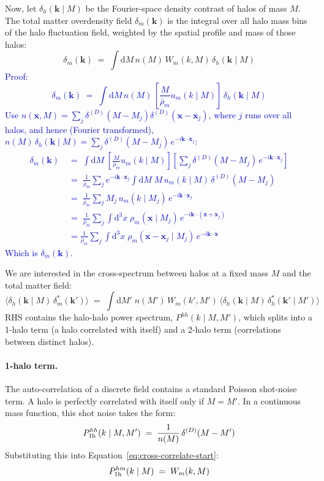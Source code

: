 \documentclass{article}
\newcommand{\dd}{\mathrm{d}}
\newcommand{\bx}{\mathbf{x}}
\newcommand{\bk}{\mathbf{k}}
\begin{document}
Now, let $\delta_h(\bk \mid M)$ be the Fourier-space density contrast of halos of mass $M$. The total matter overdensity field $\delta_m(\bk)$ is the integral over all halo mass bins of the halo fluctuation field, weighted by the spatial profile and mass of those halos:
\begin{equation}
    \delta_m(\bk) \;=\; \int \dd M \, n(M) \, W_m(k,M) \, \delta_h(\bk \mid M)
    \label{eq:stack}
\end{equation}
\textcolor{blue}{
Proof:
\[
    \delta_m(\bk) \;=\; \int \dd M \, n(M) \, \left[ \frac{M}{\bar\rho_m} u_m(k \mid M) \right] \, \delta_h(\bk \mid M)
\]
Use $n(\bx, M) = \sum_j \delta^{(D)}(M - M_j)\delta^{(D)}(\bx - \bx_j)$, where $j$ runs over all halos, and hence (Fourier transformed), $n(M) \, \delta_h(\bk \mid M) = \sum_{j} \delta^{(D)}(M - M_j) \, e^{-i \bk \cdot \bx_j}$:
\begin{align*}
    \delta_m(\bk) \; &=\; \int \dd M \; \left[ \frac{M}{\bar\rho_m} u_m(k \mid M) \right] \left[ \sum_{j} \delta^{(D)}(M - M_j) \, e^{-i \bk \cdot \bx_j} \right] \\
    &=\; \frac{1}{\bar\rho_m} \sum_{j} e^{-i \bk \cdot \bx_j} \int \dd M \; M \, u_m(k \mid M) \, \delta^{(D)}(M - M_j) \\
    &=\; \frac{1}{\bar\rho_m} \sum_{j} M_j \, u_m(k \mid M_j) \, e^{-i \bk \cdot \bx_j} \\ &=\; \frac{1}{\bar\rho_m} \sum_{j}\int \dd^3x \; \rho_m(\bx \mid M_j) \, e^{-i \bk \cdot (\bx+\bx_j)}
    \\ &= \frac{1}{\bar\rho_m} \sum_{j}\int \dd^3x \; \rho_m(\bx - \bx_j \mid M_j) \, e^{-i \bk \cdot \bx}
\end{align*}
Which is $\delta_m(\bk)$.
}

We are interested in the cross-spectrum between halos at a fixed mass $M$ and the total matter field:
\begin{equation}
    \big\langle \delta_h(\bk \mid M) \, \delta_m^*(\bk') \big\rangle
    \;=\; \int \dd M' \; n(M') \, W_m(k',M') \, 
    \big\langle \delta_h(\bk \mid M) \, \delta_h^*(\bk' \mid M') \big\rangle
    \label{eq:cross-correlate-start}
\end{equation}
RHS contains the halo-halo power spectrum, $P^{hh}(k \mid M, M')$, which splits into a 1-halo term (a halo correlated with itself) and a 2-halo term (correlations between distinct halos).

\paragraph{1-halo term.} 
The auto-correlation of a discrete field contains a standard Poisson shot-noise term. A halo is perfectly correlated with itself only if $M = M'$. In a continuous mass function, this shot noise takes the form:
\begin{equation}
    P^{hh}_{\rm 1h}(k \mid M, M') \;=\; \frac{1}{n(M)} \, \delta^{(D)}(M - M')
\end{equation}
Substituting this into Equation~\eqref{eq:cross-correlate-start}:
\begin{equation}
    P^{hm}_{\rm 1h}(k \mid M) \;=\; W_m(k,M)
\end{equation}
\end{document}
